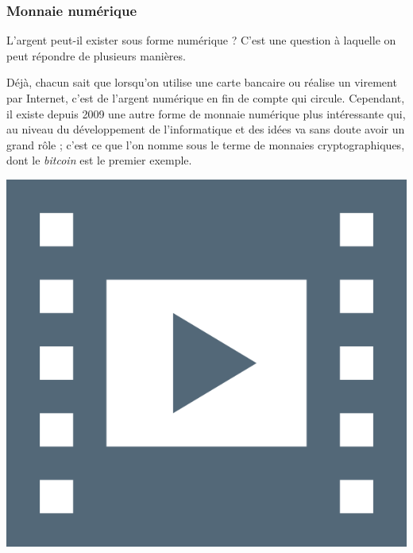 \subsubsection[Monnaie numérique]{Monnaie numérique}
\label{subsub:II.3.1.1}

L'argent peut-il exister sous forme numérique ? C'est une question à laquelle on peut répondre de plusieurs manières.

Déjà, chacun sait que lorsqu’on utilise une carte bancaire ou réalise un virement par Internet, c'est de l'argent numérique en fin de compte qui circule. Cependant, il existe depuis 2009 une autre forme de monnaie numérique plus intéressante qui, au niveau du développement de l'informatique et des idées va sans doute avoir un grand rôle ; c'est ce que l'on nomme sous le terme de monnaies cryptographiques, dont le \textit{bitcoin} est le premier exemple.


\begin{marginvideo}
	\href{https://www.youtube.com/watch?v=a3EHogSreCs&list=PLWvGMqXvyJAMNWRvODUB5Ry3licACdaa0&index=14}%
		{\includegraphics[width=\marginparwidth]{./Images/Pictograms/film-strip-dark-electric-blue.png}}%
\end{marginvideo}

